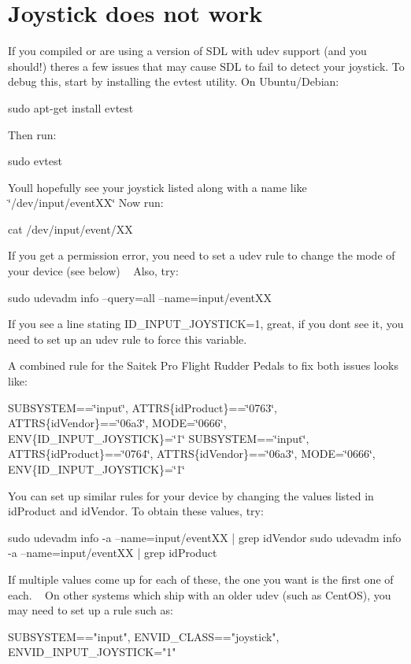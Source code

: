  \section*{Joystick does not work }

If you compiled or are using a version of S\+DL with udev support (and you should!) there\textquotesingle{}s a few issues that may cause S\+DL to fail to detect your joystick. To debug this, start by installing the evtest utility. On Ubuntu/\+Debian\+: \begin{DoxyVerb}sudo apt-get install evtest
\end{DoxyVerb}


Then run\+: \begin{DoxyVerb}sudo evtest
\end{DoxyVerb}


You\textquotesingle{}ll hopefully see your joystick listed along with a name like \char`\"{}/dev/input/event\+X\+X\char`\"{} Now run\+: \begin{DoxyVerb}cat /dev/input/event/XX
\end{DoxyVerb}


If you get a permission error, you need to set a udev rule to change the mode of your device (see below) ~\newline
 Also, try\+: \begin{DoxyVerb}sudo udevadm info --query=all --name=input/eventXX
\end{DoxyVerb}


If you see a line stating I\+D\+\_\+\+I\+N\+P\+U\+T\+\_\+\+J\+O\+Y\+S\+T\+I\+CK=1, great, if you don\textquotesingle{}t see it, you need to set up an udev rule to force this variable.

A combined rule for the Saitek Pro Flight Rudder Pedals to fix both issues looks like\+:

S\+U\+B\+S\+Y\+S\+T\+EM==\char`\"{}input\char`\"{}, A\+T\+T\+RS\{id\+Product\}==\char`\"{}0763\char`\"{}, A\+T\+T\+RS\{id\+Vendor\}==\char`\"{}06a3\char`\"{}, M\+O\+DE=\char`\"{}0666\char`\"{}, E\+NV\{I\+D\+\_\+\+I\+N\+P\+U\+T\+\_\+\+J\+O\+Y\+S\+T\+I\+CK\}=\char`\"{}1\char`\"{} S\+U\+B\+S\+Y\+S\+T\+EM==\char`\"{}input\char`\"{}, A\+T\+T\+RS\{id\+Product\}==\char`\"{}0764\char`\"{}, A\+T\+T\+RS\{id\+Vendor\}==\char`\"{}06a3\char`\"{}, M\+O\+DE=\char`\"{}0666\char`\"{}, E\+NV\{I\+D\+\_\+\+I\+N\+P\+U\+T\+\_\+\+J\+O\+Y\+S\+T\+I\+CK\}=\char`\"{}1\char`\"{}

You can set up similar rules for your device by changing the values listed in id\+Product and id\+Vendor. To obtain these values, try\+: \begin{DoxyVerb}sudo udevadm info -a --name=input/eventXX | grep idVendor
sudo udevadm info -a --name=input/eventXX | grep idProduct
\end{DoxyVerb}


If multiple values come up for each of these, the one you want is the first one of each. ~\newline
 On other systems which ship with an older udev (such as Cent\+OS), you may need to set up a rule such as\+: \begin{DoxyVerb}SUBSYSTEM=="input", ENV{ID_CLASS}=="joystick", ENV{ID_INPUT_JOYSTICK}="1"\end{DoxyVerb}
 